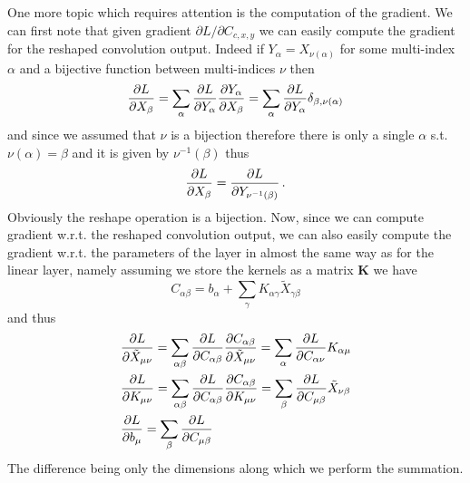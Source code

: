 \documentclass{myclass}
\begin{document}
One more topic which requires attention is the computation of the gradient. We can first note that
given gradient $\partial{L}/\partial{C_{c,x,y}}$ we can easily compute the gradient for the reshaped
convolution output. Indeed if $Y_\alpha = X_{\nu(\alpha)}$ for some multi-index $\alpha$ and a
bijective function between multi-indices $\nu$ then
\[
   \pdv{L}{X_\beta} = \sum_{\alpha} \pdv{L}{Y_\alpha} \pdv{Y_\alpha}{X_\beta} = \sum_{\alpha} \pdv{L}{Y_\alpha} \delta_{\beta, \nu(\alpha)}
\]
and since we assumed that $\nu$ is a bijection therefore there is only a single $\alpha$ s.t.
$\nu(\alpha) = \beta$ and it is given by $\nu^{-1}(\beta)$ thus
\[
   \pdv{L}{X_\beta} = \pdv{L}{Y_{\nu^{-1}(\beta)}}\,.
\]
Obviously the reshape operation is a bijection. Now, since we can compute gradient w.r.t. the
reshaped convolution output, we can also easily compute the gradient w.r.t. the parameters of the
layer in almost the same way as for the linear layer, namely assuming we store the kernels as a
matrix $\bm{K}$ we have
\[
   C_{\alpha\beta} = b_\alpha + \sum_{\gamma} K_{\alpha\gamma} \tilde{X}_{\gamma\beta}
\]
and thus
\[
\begin{split}
   &\pdv{L}{\tilde{X}_{\mu\nu}} = \sum_{\alpha\beta} \pdv{L}{C_{\alpha\beta}} \pdv{C_{\alpha\beta}}{\tilde{X}_{\mu\nu}} 
                                = \sum_{\alpha} \pdv{L}{C_{\alpha\nu}} K_{\alpha\mu}\\
   &\pdv{L}{K_{\mu\nu}} = \sum_{\alpha\beta} \pdv{L}{C_{\alpha\beta}} \pdv{C_{\alpha\beta}}{K_{\mu\nu}} 
                        = \sum_{\beta} \pdv{L}{C_{\mu\beta}} \tilde{X}_{\nu\beta}\\
   &\pdv{L}{b_\mu} = \sum_{\beta} \pdv{L}{C_{\mu\beta}}
\end{split}
\]
The difference being only the dimensions along which we perform the summation.
\end{document}

